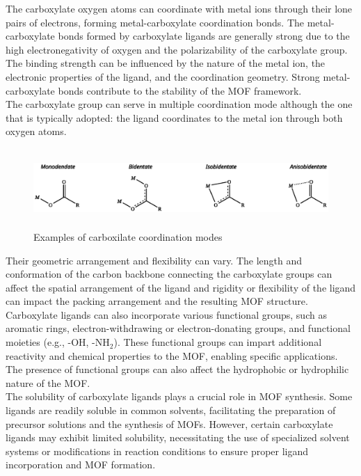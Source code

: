 \documentclass[../Master.tex]{subfiles}
\begin{document}
The carboxylate oxygen atoms can coordinate with metal ions through their lone pairs of electrons, forming metal-carboxylate coordination bonds. The metal-carboxylate bonds formed by carboxylate ligands are generally strong due to the high electronegativity of oxygen and the polarizability of the carboxylate group. The binding strength can be influenced by the nature of the metal ion, the electronic properties of the ligand, and the coordination geometry. Strong metal-carboxylate bonds contribute to the stability of the MOF framework. \\
The carboxylate group can serve in multiple coordination mode although the one that is typically adopted: the ligand coordinates to the metal ion through both oxygen atoms.\\

\begin{figure}[h!]
	\centering
	\includegraphics[width=16cm,height=3cm,keepaspectratio]{Structures/carboxcordmode.eps}
	\caption{Examples of carboxilate coordination modes}\label{fig:carboxcordmode}
\end{figure}

Their geometric arrangement and flexibility can vary. The length and conformation of the carbon backbone connecting the carboxylate groups can affect the spatial arrangement of the ligand and rigidity or flexibility of the ligand can impact the packing arrangement and the resulting MOF structure. \\
Carboxylate ligands can also incorporate various functional groups, such as aromatic rings, electron-withdrawing or electron-donating groups, and functional moieties (e.g., -OH, -NH$_{2}$). These functional groups can impart additional reactivity and chemical properties to the MOF, enabling specific applications. The presence of functional groups can also affect the hydrophobic or hydrophilic nature of the MOF.\\
The solubility of carboxylate ligands plays a crucial role in MOF synthesis. Some ligands are readily soluble in common solvents, facilitating the preparation of precursor solutions and the synthesis of MOFs. However, certain carboxylate ligands may exhibit limited solubility, necessitating the use of specialized solvent systems or modifications in reaction conditions to ensure proper ligand incorporation and MOF formation.
\end{document}
